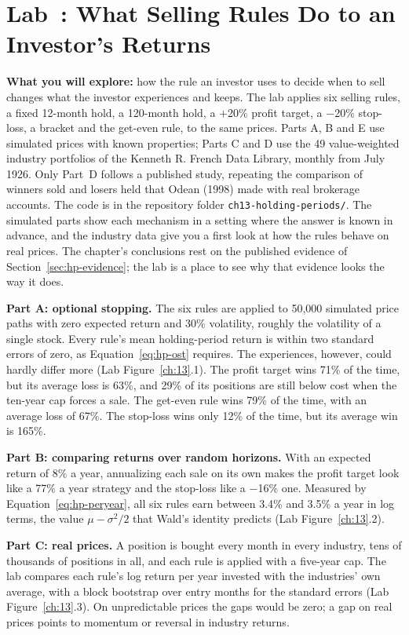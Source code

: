 \section{Lab~\thechapter: What Selling Rules Do to an Investor's Returns}
\label{sec:hp-lab}

\textbf{What you will explore:} how the rule an investor uses to decide when to sell changes what the investor experiences and keeps. The lab applies six selling rules, a fixed 12-month hold, a 120-month hold, a $+$20\% profit target, a $-$20\% stop-loss, a bracket and the get-even rule, to the same prices. Parts A, B and E use simulated prices with known properties; Parts C and D use the 49 value-weighted industry portfolios of the Kenneth R. French Data Library, monthly from July 1926. Only Part~D follows a published study, repeating the comparison of winners sold and losers held that Odean (1998) made with real brokerage accounts. The code is in the repository folder \texttt{ch13-holding-periods/}. The simulated parts show each mechanism in a setting where the answer is known in advance, and the industry data give you a first look at how the rules behave on real prices. The chapter's conclusions rest on the published evidence of Section~\ref{sec:hp-evidence}; the lab is a place to see why that evidence looks the way it does.

\textbf{Part A: optional stopping.} The six rules are applied to 50,000 simulated price paths with zero expected return and 30\% volatility, roughly the volatility of a single stock. Every rule's mean holding-period return is within two standard errors of zero, as Equation~\eqref{eq:hp-ost} requires. The experiences, however, could hardly differ more (Lab Figure~\ref{ch:13}.1). The profit target wins 71\% of the time, but its average loss is 63\%, and 29\% of its positions are still below cost when the ten-year cap forces a sale. The get-even rule wins 79\% of the time, with an average loss of 67\%. The stop-loss wins only 12\% of the time, but its average win is 165\%.

\textbf{Part B: comparing returns over random horizons.} With an expected return of 8\% a year, annualizing each sale on its own makes the profit target look like a 77\% a year strategy and the stop-loss like a $-$16\% one. Measured by Equation~\eqref{eq:hp-peryear}, all six rules earn between 3.4\% and 3.5\% a year in log terms, the value $\mu - \sigma^2/2$ that Wald's identity predicts (Lab Figure~\ref{ch:13}.2).

\textbf{Part C: real prices.} A position is bought every month in every industry, tens of thousands of positions in all, and each rule is applied with a five-year cap. The lab compares each rule's log return per year invested with the industries' own average, with a block bootstrap over entry months for the standard errors (Lab Figure~\ref{ch:13}.3). On unpredictable prices the gaps would be zero; a gap on real prices points to momentum or reversal in industry returns.

